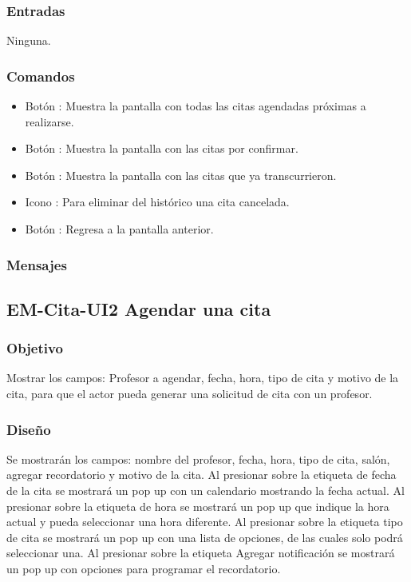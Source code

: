 \subsubsection{Entradas}
	\noindent
	Ninguna.

\subsubsection{Comandos}
	\begin{itemize}
		\item Botón : Muestra la pantalla con todas las citas agendadas próximas a realizarse.
		\item Botón : Muestra la pantalla con las citas por confirmar.
		\item Botón : Muestra la pantalla con las citas que ya transcurrieron.
		\item Icono : Para eliminar del histórico una cita cancelada.
		\item Botón : Regresa a la pantalla anterior.
	\end{itemize}

\subsubsection{Mensajes}
	\begin{Citemize}
		\item {}
	\end{Citemize}


\pagebreak
\subsection{EM-Cita-UI2 Agendar una cita }

\subsubsection{Objetivo}
	\noindent
	Mostrar los campos: Profesor a agendar, fecha, hora, tipo de cita y
	motivo de la cita, para que el actor pueda generar una solicitud de cita con un profesor.

\subsubsection{Diseño}
	\noindent
	Se mostrarán los campos: nombre del profesor, fecha, hora, tipo de cita, salón, agregar recordatorio y
	motivo de la cita.
	 Al presionar sobre la etiqueta de fecha de la cita se mostrará un pop up con un
	calendario mostrando la fecha actual. Al presionar sobre la etiqueta de hora se mostrará un
	pop up que indique la hora actual y pueda seleccionar una hora diferente.
	Al presionar sobre la etiqueta tipo de cita se mostrará un pop up con una lista de opciones, de las
	cuales solo podrá seleccionar una. Al presionar sobre la etiqueta Agregar notificación se mostrará
	un pop up con opciones para programar el recordatorio.

